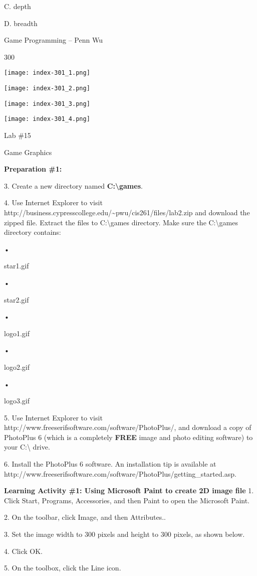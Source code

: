 \documentclass[
]{article}
\begin{document}
C. depth

D. breadth

Game Programming -- Penn Wu

300

\protect\hypertarget{index_split_015.htmlux5cux23p301}{}{}\texttt{[image: index-301\_1.png]}

\texttt{[image: index-301\_2.png]}

\texttt{[image: index-301\_3.png]}

\texttt{[image: index-301\_4.png]}

Lab \#15

Game Graphics

\textbf{}

\textbf{Preparation \#1:}

3. Create a new directory named \textbf{C:\textbackslash games}.

4. Use Internet Explorer to visit
http://business.cypresscollege.edu/\textasciitilde pwu/cis261/files/lab2.zip
and download the zipped file. Extract the files to
C:\textbackslash games directory. Make sure the C:\textbackslash games
directory contains:

•

star1.gif

•

star2.gif

•

logo1.gif

•

logo2.gif

•

logo3.gif

5. Use Internet Explorer to visit
http://www.freeserifsoftware.com/software/PhotoPlus/, and download a
copy of PhotoPlus 6 (which is a completely \textbf{FREE} image and photo
editing software) to your C:\textbackslash{} drive.

6. Install the PhotoPlus 6 software. An installation tip is available at
http://www.freeserifsoftware.com/software/PhotoPlus/getting\_started.asp.

\textbf{Learning Activity \#1: Using Microsoft Paint to create 2D image
file} 1. Click Start, Programs, Accessories, and then Paint to open the
Microsoft Paint.

2. On the toolbar, click Image, and then Attributes..

3. Set the image width to 300 pixels and height to 300 pixels, as shown
below.

4. Click OK.

5. On the toolbox, click the Line icon.
\end{document}
